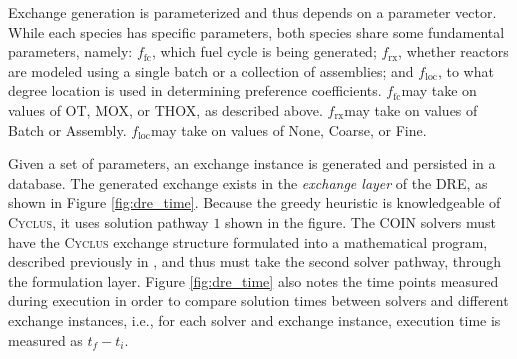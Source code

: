 \documentclass{anstrans}
\newcommand{\Cyclus}{\textsc{Cyclus}}
\newcommand{\ffc}{$f_{\text{fc}}$}
\newcommand{\frx}{$f_{\text{rx}}$}
\newcommand{\floc}{$f_{\text{loc}}$}
\begin{document}
Exchange generation is parameterized and thus depends on a parameter
vector. While each species has specific parameters, both species share some
fundamental parameters, namely: \ffc, which fuel cycle is being generated; \frx,
whether reactors are modeled using a single batch or a collection of assemblies;
and \floc, to what degree location is used in determining preference
coefficients. \ffc may take on values of OT, MOX, or THOX, as described
above. \frx may take on values of Batch or Assembly. \floc may take on values of
None, Coarse, or Fine.


Given a set of parameters, an exchange instance is generated and persisted in a
database. The generated exchange exists in the \textit{exchange layer} of the
DRE, as shown in Figure \ref{fig:dre_time}. Because the greedy heuristic is
knowledgeable of \Cyclus, it uses solution pathway $1$ shown in the figure. The
COIN solvers must have the \Cyclus{} exchange structure formulated into a
mathematical program, described previously in \cite{gidden_agent-based_2013},
and thus must take the second solver pathway, through the formulation
layer. Figure \ref{fig:dre_time} also notes the time points measured during
execution in order to compare solution times between solvers and different
exchange instances, i.e., for each solver and exchange instance, execution time
is measured as $t_f - t_i$.
\end{document}
